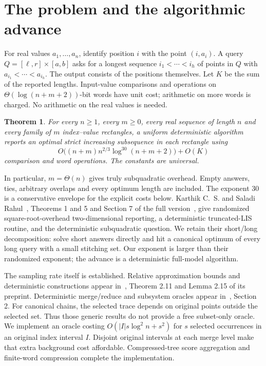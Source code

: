\documentclass[acmsmall,11pt,nonacm,natbib=false]{acmart}
\newtheorem{theorem}{Theorem}
\begin{document}
\section{The problem and the algorithmic advance}
For real values $a_1,\ldots,a_n$, identify position $i$ with the point
$(i,a_i)$. A query $Q=[\ell,r]\times[a,b]$ asks for a longest sequence
$i_1<\cdots<i_h$ of points in $Q$ with
$a_{i_1}<\cdots<a_{i_h}$. The output consists of the positions themselves.
Let $K$ be the sum of the reported lengths. Input-value comparisons and
operations on $\Theta(\log(n+m+2))$-bit words have unit cost; arithmetic on
more words is charged. No arithmetic on the real values is needed.

\begin{theorem}\label{thm:main}
For every $n\geq1$, every $m\geq0$, every real sequence of length $n$ and
every family of $m$ index--value rectangles, a uniform deterministic
algorithm reports an optimal strict increasing subsequence in each rectangle
using
\[
 O\bigl((n+m)n^{2/3}\log^{30}(n+m+2)\bigr)+O(K)
\]
comparison and word operations. The constants are universal.
\end{theorem}

In particular, $m=\Theta(n)$ gives truly subquadratic overhead. Empty
answers, ties, arbitrary overlaps and every optimum length are included.
The exponent $30$ is a conservative envelope for the explicit costs below.
Karthik C.~S. and Saladi Rahul~\cite{KR26}, Theorems 1 and 5 and Section 7
of the full version~\cite{KRfull}, give randomized square-root-overhead
two-dimensional reporting, a deterministic truncated-LIS routine, and the
deterministic subquadratic question. We retain their short/long decomposition:
solve short answers directly and hit a canonical optimum of every long
query with a small stitching set. Our exponent is larger than their
randomized exponent; the advance is a deterministic full-model algorithm.

The sampling rate itself is established. Relative approximation bounds
and deterministic constructions appear in~\cite{HS11}, Theorem 2.11 and
Lemma 2.15 of its preprint. Deterministic merge/reduce and subsystem oracles
appear in~\cite{BCEG04}, Section 2. For canonical chains, the selected trace
depends on original points outside the selected set. Thus those generic
results do not provide a free subset-only oracle. We implement an oracle
costing $O(|I|s\log^2 n+s^2)$ for $s$ selected occurrences in an original
index interval $I$. Disjoint original intervals at each merge level make
that extra background cost affordable. Compressed-tree score aggregation
and finite-word compression complete the implementation.
\end{document}
